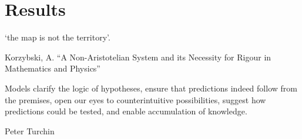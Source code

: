 \chapter{Results} \label{chapter-results}

\epigraph{‘the map is not the territory’.}{Korzybski, A.  “A Non-Aristotelian System and its Necessity for Rigour in Mathematics and Physics”}
\epigraph{ Models clarify the logic of hypotheses, ensure that predictions indeed follow from the premises, open our eyes to counterintuitive possibilities, suggest how predictions could be tested, and enable accumulation of knowledge.}{Peter Turchin \cite{turchinWhatEconomicsModels2017}}




